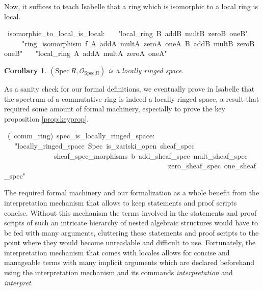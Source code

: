 \documentclass[12pt]{scrartcl}
\newtheorem{cor}[proposition]{Corollary}
\def\spec{\text{Spec}\,R}
\begin{document}
Now, it suffices to teach Isabelle that a ring which is isomorphic to a local ring is local.


\begin{isabelle}
\ isomorphic\_to\_local\_is\_local:\isanewline
\ \ \ "local\_ring\ B\ addB\ multB\ zeroB\ oneB"\isanewline
\ \ \ \ \ "ring\_isomorphism\ f\ A\ addA\ multA\ zeroA\ oneA\ B\ addB\ multB\ zeroB\ oneB"\isanewline
\ \ \ "local\_ring\ A\ addA\ multA\ zeroA\ oneA"
\end{isabelle}
	
\begin{cor}
	$(\text{Spec}\,R, \mathscr{O}_{\spec} )$ is a locally ringed space.
\end{cor}

As a sanity check for our formal definitions, we eventually prove in Isabelle that the spectrum of a commutative ring is indeed a locally ringed space, a result that required some amount of formal machinery, especially to prove the key proposition \ref{prop:keyprop}.

\begin{isabelle}
\ (\ comm\_ring)\ spec\_is\_locally\_ringed\_space:\isanewline
\ \ \ "locally\_ringed\_space\ Spec\ is\_zariski\_open\ sheaf\_spec\ \isanewline
\ \ \ \ \ \ \ \ \ \ \ \ \ \ sheaf\_spec\_morphisms\ \isasymO b\ add\_sheaf\_spec\ mult\_sheaf\_spec\ \isanewline
\ \ \ \ \ \ \ \ \ \ \ \ \ \ \ \ \ \ \ \ \ \ \ \ \ \ \ \ \ \ \ \ \ \ \ \ \ \ \ \ \ \ \ \ \ \ zero\_sheaf\_spec\ one\_sheaf\_spec"
\end{isabelle}

The required formal machinery and our formalization as a whole benefit from the interpretation mechanism that allows to keep statements and proof scripts concise. Without this mechanism the terms involved in the statements and proof scripts of such an intricate hierarchy of nested algebraic structures would have to be fed with many arguments, cluttering these statements and proof scripts to the point where they would become unreadable and difficult to use. Fortunately, the interpretation mechanism that comes with locales allows for concise and manageable terms with many implicit arguments which are declared beforehand using the interpretation mechanism and its commands \textit{interpretation} and \textit{interpret}.
  
\end{document}
